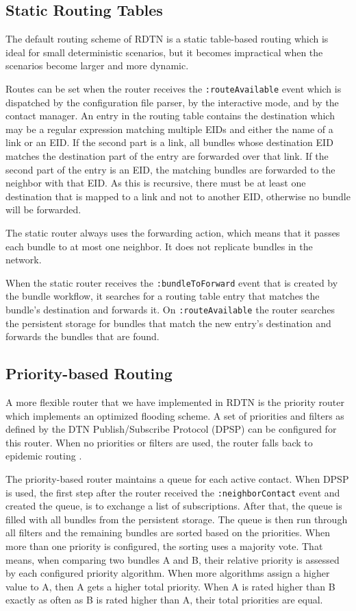 \documentclass[a4paper]{article}
\begin{document}
\subsection{Static Routing Tables}\label{sec.static-routing}

The default routing scheme of RDTN is a static table-based routing which is
ideal for small deterministic scenarios, but it becomes impractical when the
scenarios become larger and more dynamic.

Routes can be set when the router receives the {\tt :routeAvailable} event which
is dispatched by the configuration file parser, by the interactive mode, and by
the contact manager.  An entry in the routing table contains the destination
which may be a regular expression matching multiple EIDs and either the name of
a link or an EID. If the second part is a link, all bundles whose destination
EID matches the destination part of the entry are forwarded over that link. If
the second part of the entry is an EID, the matching bundles are forwarded to
the neighbor with that EID. As this is recursive, there must be at least one
destination that is mapped to a link and not to another EID, otherwise no bundle
will be forwarded.

The static router always uses the forwarding action, which means that it
passes each bundle to at most one neighbor. It does not replicate bundles in the
network.

When the static router receives the {\tt :bundleToForward} event that is created
by the bundle workflow, it searches for a routing table entry that matches the
bundle's destination and forwards it.  On {\tt :routeAvailable} the router
searches the persistent storage for bundles that match the new entry's
destination and forwards the bundles that are found.

\subsection{Priority-based Routing}\label{sec.prio-routing}

A more flexible router that we have implemented in RDTN is the
priority router which implements an optimized flooding scheme. A set of
priorities and filters as defined by the DTN Publish/Subscribe Protocol (DPSP)
\cite{dtn-pubsub} can be configured for this router. When no priorities or
filters are used, the router falls back to epidemic routing \cite{epidemic}.


The priority-based router maintains a queue for each active contact. When DPSP
is used, the first step after the router received the {\tt :neighborContact}
event and created the queue, is to exchange a list of subscriptions.  After
that, the queue is filled with all bundles from the persistent storage. The
queue is then run through all filters and the remaining bundles are sorted based
on the priorities. When more than one priority is configured, the sorting uses a
majority vote. That means, when comparing two bundles A and B, their relative
priority is assessed by each configured priority algorithm. When more algorithms
assign a higher value to A, then A gets a higher total priority. When A is rated
higher than B exactly as often as B is rated higher than A, their total
priorities are equal.
\end{document}

